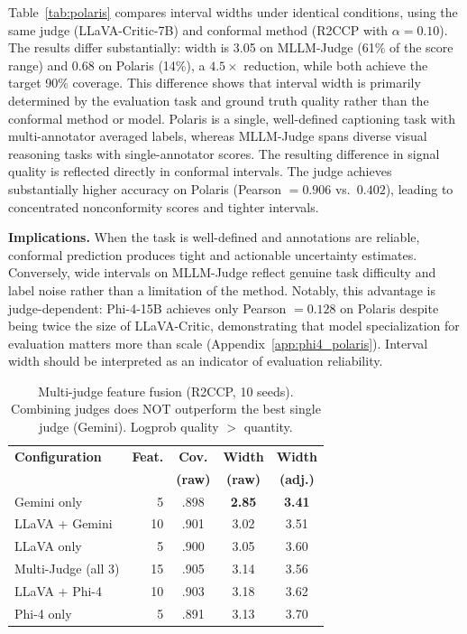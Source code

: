 \documentclass{article}
\begin{document}
Table~\ref{tab:polaris} compares interval widths under identical conditions, using the same judge (LLaVA-Critic-7B) and conformal method (R2CCP with $\alpha = 0.10$). The results differ substantially: width is 3.05 on MLLM-Judge (61\% of the score range) and 0.68 on Polaris (14\%), a $4.5\times$ reduction, while both achieve the target 90\% coverage. This difference shows that interval width is primarily determined by the evaluation task and ground truth quality rather than the conformal method or model. Polaris is a single, well-defined captioning task with multi-annotator averaged labels, whereas MLLM-Judge spans diverse visual reasoning tasks with single-annotator scores. The resulting difference in signal quality is reflected directly in conformal intervals. The judge achieves substantially higher accuracy on Polaris (Pearson $= 0.906$ vs.\ $0.402$), leading to concentrated nonconformity scores and tighter intervals.

\textbf{Implications.}
When the task is well-defined and annotations are reliable, conformal prediction produces tight and actionable uncertainty estimates. Conversely, wide intervals on MLLM-Judge reflect genuine task difficulty and label noise rather than a limitation of the method. Notably, this advantage is judge-dependent: Phi-4-15B achieves only Pearson $= 0.128$ on Polaris despite being twice the size of LLaVA-Critic, demonstrating that model specialization for evaluation matters more than scale (Appendix~\ref{app:phi4_polaris}). Interval width should be interpreted as an indicator of evaluation reliability.

\begin{table}[t]
\centering
\caption{Multi-judge feature fusion (R2CCP, 10 seeds). Combining judges does NOT outperform the best single judge (Gemini). Logprob quality $>$ quantity.}
\label{tab:multijudge}
\small
\begin{tabular}{lrccc}
\toprule
\textbf{Configuration} & \textbf{Feat.} & \textbf{Cov.} & \textbf{Width} & \textbf{Width} \\
& & \textbf{(raw)} & \textbf{(raw)} & \textbf{(adj.)} \\
\midrule
Gemini only & 5 & .898 & \textbf{2.85} & \textbf{3.41} \\
LLaVA + Gemini & 10 & .901 & 3.02 & 3.51 \\
LLaVA only & 5 & .900 & 3.05 & 3.60 \\
Multi-Judge (all 3) & 15 & .905 & 3.14 & 3.56 \\
LLaVA + Phi-4 & 10 & .903 & 3.18 & 3.62 \\
Phi-4 only & 5 & .891 & 3.13 & 3.70 \\
\bottomrule
\end{tabular}
\end{table}
\end{document}
